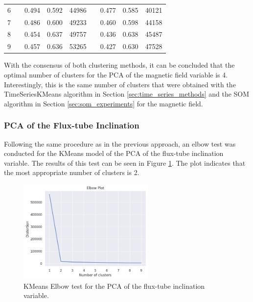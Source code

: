 \begin{table}[]
\begin{tabular}{@{}rlrrrlrcc@{}}
6                              &  & 0.494                                & 0.592                           & 44986                           &  & 0.477            & 0.585       & 40121       \\
7                              &  & 0.486                                & 0.600                           & 49233                           &  & 0.460            & 0.598       & 44158       \\
8                              &  & 0.454                                & 0.637                           & 49757                           &  & 0.436            & 0.638       & 45487       \\
9                              &  & 0.457                                & 0.636                           & 53265                           &  & 0.427            & 0.630       & 47528       \\ \bottomrule
\end{tabular}
\end{table}

With the consensus of both clustering methods, it can be concluded that the optimal number of clusters for the PCA of the magnetic field variable is 4. Interestingly, this is the same number of clusters that were obtained with the TimeSeriesKMeans algorithm in Section \ref{sec:time_series_methods} and the SOM algorithm in Section \ref{sec:som_experiments} for the magnetic field.

\subsubsection{PCA of the Flux-tube Inclination}\label{sec:pca_a}
Following the same procedure as in the previous approach, an elbow test was conducted for the KMeans model of the PCA of the flux-tube inclination variable. The results of this test can be seen in Figure \ref{fig:pca_a_elbow}. The plot indicates that the most appropriate number of clusters is 2.


\begin{figure}[]
    \caption{KMeans Elbow test for the PCA of the flux-tube inclination variable.}
    \label{fig:pca_a_elbow}
    \centering
    \includegraphics[width=0.6\textwidth]{figures/pca_alpha_elbow_test.png}
\end{figure}

